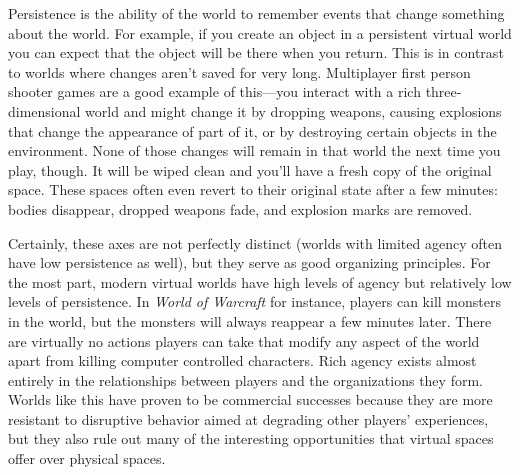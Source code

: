 Persistence is the ability of the world to remember events that change something about the world. For example, if you create an object in a persistent virtual world you can expect that the object will be there when you return. This is in contrast to worlds where changes aren't saved for very long. Multiplayer first person shooter games are a good example of this---you interact with a rich three-dimensional world and might change it by dropping weapons, causing explosions that change the appearance of part of it, or by destroying certain objects in the environment. None of those changes will remain in that world the next time you play, though. It will be wiped clean and you'll have a fresh copy of the original space. These spaces often even revert to their original state after a few minutes: bodies disappear, dropped weapons fade, and explosion marks are removed. 

Certainly, these axes are not perfectly distinct (worlds with limited agency often have low persistence as well), but they serve as good organizing principles. For the most part, modern virtual worlds have high levels of agency but relatively low levels of persistence. In \emph{World of Warcraft} for instance, players can kill monsters in the world, but the monsters will always reappear a few minutes later. There are virtually no actions players can take that modify any aspect of the world apart from killing computer controlled characters. Rich agency exists almost entirely in the relationships between players and the organizations they form. Worlds like this have proven to be commercial successes because they are more resistant to disruptive behavior aimed at degrading other players' experiences, but they also rule out many of the interesting opportunities that virtual spaces offer over physical spaces.

